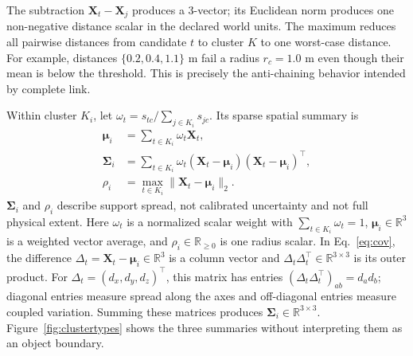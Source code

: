 \documentclass[a4paper,9pt]{extarticle}
\newcommand{\R}{\mathbb R}
\begin{document}
The subtraction $\mathbf X_t-\mathbf X_j$ produces a 3-vector; its Euclidean
norm produces one non-negative distance scalar in the declared world units.
The maximum reduces all pairwise distances from candidate $t$ to cluster $K$
to one worst-case distance. For example, distances
$\{0.2,0.4,1.1\}$ m fail a radius $r_c=1.0$ m even though their mean is below
the threshold. This is precisely the anti-chaining behavior intended by
complete link.

Within cluster $K_i$, let
$\omega_t=s_{tc}/\sum_{j\in K_i}s_{jc}$. Its sparse spatial summary is
\begin{align}
 \bm\mu_i&=\sum_{t\in K_i}\omega_t\mathbf X_t, \label{eq:center}\\
 \bm\Sigma_i&=\sum_{t\in K_i}\omega_t
 (\mathbf X_t-\bm\mu_i)(\mathbf X_t-\bm\mu_i)^\top, \label{eq:cov}\\
 \rho_i&=\max_{t\in K_i}\|\mathbf X_t-\bm\mu_i\|_2. \label{eq:radius}
\end{align}
$\bm\Sigma_i$ and $\rho_i$ describe support spread, not calibrated uncertainty and not full physical extent.
Here $\omega_t$ is a normalized scalar weight with
$\sum_{t\in K_i}\omega_t=1$, $\bm\mu_i\in\R^3$ is a weighted vector average,
and $\rho_i\in\R_{\ge0}$ is one radius scalar. In Eq.~\ref{eq:cov}, the
difference $\Delta_t=\mathbf X_t-\bm\mu_i\in\R^3$ is a column vector and
$\Delta_t\Delta_t^\top\in\R^{3\times3}$ is its outer product. For
$\Delta_t=(d_x,d_y,d_z)^\top$, this matrix has entries
$(\Delta_t\Delta_t^\top)_{ab}=d_a d_b$; diagonal entries measure spread along
the axes and off-diagonal entries measure coupled variation. Summing these
matrices produces $\bm\Sigma_i\in\R^{3\times3}$. Figure~\ref{fig:clustertypes}
shows the three summaries without interpreting them as an object boundary.
\end{document}
